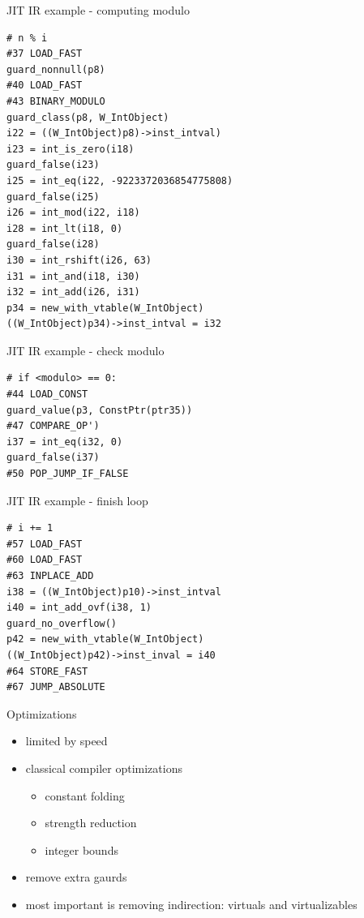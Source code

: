 \documentclass[14pt]{beamer}
\begin{document}
\begin{frame}[fragile]{JIT IR example - computing modulo}
\footnotesize{
\begin{verbatim}
# n % i
#37 LOAD_FAST
guard_nonnull(p8)
#40 LOAD_FAST
#43 BINARY_MODULO
guard_class(p8, W_IntObject)
i22 = ((W_IntObject)p8)->inst_intval)
i23 = int_is_zero(i18)
guard_false(i23)
i25 = int_eq(i22, -9223372036854775808)
guard_false(i25)
i26 = int_mod(i22, i18)
i28 = int_lt(i18, 0)
guard_false(i28)
i30 = int_rshift(i26, 63)
i31 = int_and(i18, i30)
i32 = int_add(i26, i31)
p34 = new_with_vtable(W_IntObject)
((W_IntObject)p34)->inst_intval = i32
\end{verbatim}
}
\end{frame}

\begin{frame}[fragile]{JIT IR example - check modulo}
\footnotesize{
\begin{verbatim}
# if <modulo> == 0:
#44 LOAD_CONST
guard_value(p3, ConstPtr(ptr35))
#47 COMPARE_OP')
i37 = int_eq(i32, 0)
guard_false(i37)
#50 POP_JUMP_IF_FALSE
\end{verbatim}
}
\end{frame}

\begin{frame}[fragile]{JIT IR example - finish loop}
\footnotesize{
\begin{verbatim}
# i += 1
#57 LOAD_FAST
#60 LOAD_FAST
#63 INPLACE_ADD
i38 = ((W_IntObject)p10)->inst_intval
i40 = int_add_ovf(i38, 1)
guard_no_overflow()
p42 = new_with_vtable(W_IntObject)
((W_IntObject)p42)->inst_inval = i40
#64 STORE_FAST
#67 JUMP_ABSOLUTE
\end{verbatim}
}
\end{frame}

\begin{frame}{Optimizations}
\begin{itemize}
\item limited by speed
\item classical compiler optimizations
\begin{itemize}
\item constant folding
\item strength reduction
\item integer bounds
\end{itemize}
\item remove extra gaurds
\item most important is removing indirection: virtuals and virtualizables
\end{itemize}
\end{frame}
\end{document}
